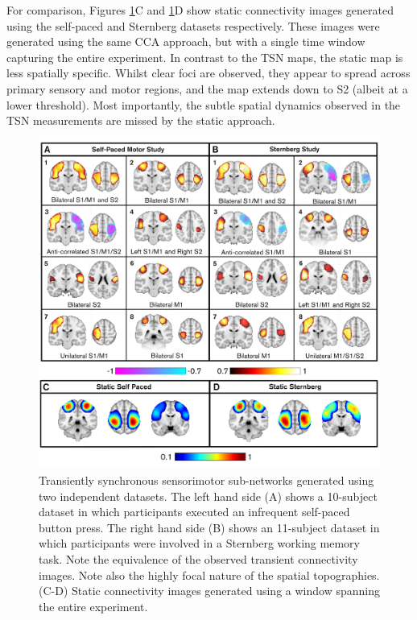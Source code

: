 For comparison, Figures \ref{figure_5_3}C and \ref{figure_5_3}D show static connectivity images generated using the self-paced and Sternberg datasets respectively. These images were generated using the same CCA approach, but with a single time window capturing the entire experiment.  In contrast to the TSN maps, the static map is less spatially specific. Whilst clear foci are observed, they appear to spread across primary sensory and motor regions, and the map extends down to S2 (albeit at a lower threshold).  Most importantly, the subtle spatial dynamics observed in the TSN measurements are missed by the static approach.

\begin{figure}[h]
	\begin{center}
		\includegraphics[width=\linewidth]{./images/chapter5/Figure_3.png}
		\caption{Transiently synchronous sensorimotor sub-networks generated using two independent datasets. The left hand side (A) shows a 10-subject dataset in which participants executed an infrequent self-paced button press. The right hand side (B) shows an 11-subject dataset in which participants were involved in a Sternberg working memory task. Note the equivalence of the observed transient connectivity images. Note also the highly focal nature of the spatial topographies. (C-D)  Static connectivity images generated using a window spanning the entire experiment. \label{figure_5_3}}
	\end{center}
\end{figure}

